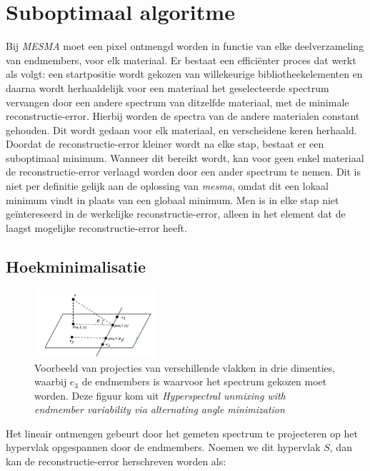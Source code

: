 \documentclass[12pt]{report}
\begin{document}
\section{Suboptimaal algoritme} \label{sec:AAM}

Bij \textit{MESMA} moet een pixel ontmengd worden in functie van elke deelverzameling van endmembers, voor elk materiaal.  Er bestaat een effici\"enter proces dat werkt als volgt: een startpositie wordt gekozen van willekeurige bibliotheekelementen en daarna wordt herhaaldelijk voor een materiaal het geselecteerde spectrum vervangen door een andere spectrum van ditzelfde materiaal, met de minimale reconstructie-error. Hierbij worden de spectra van de andere materialen constant gehouden. Dit wordt gedaan voor elk materiaal, en verscheidene keren herhaald. 
Doordat de reconstructie-error kleiner wordt na elke stap, bestaat er een suboptimaal minimum. Wanneer dit bereikt wordt, kan voor geen enkel materiaal de reconstructie-error verlaagd worden door een ander spectrum te nemen. Dit is niet per definitie gelijk aan de oplossing van \textit{mesma}, omdat dit een lokaal minimum vindt in plaats van een globaal minimum.
Men is in elke stap niet ge\"intereseerd in de werkelijke reconstructie-error, alleen in het element dat de laagst mogelijke reconstructie-error heeft.

\subsection{Hoekminimalisatie}

\begin{figure}
\includegraphics[width=0.4\textwidth]{AAMProj.PNG}
\caption{Voorbeeld van projecties van verschillende vlakken in drie dimenties, waarbij $e_3$ de endmembers is waarvoor het spectrum gekozen moet worden. Deze figuur kom uit \textit{Hyperspectral unmixing with endmember variability
via alternating angle minimization}\cite{mesma}}
\end{figure}

Het lineair ontmengen gebeurt door het gemeten spectrum te projecteren op het hypervlak opgespannen door de endmembers. Noemen we dit hypervlak $S$, dan kan de reconstructie-error herschreven worden als:
\end{document}
